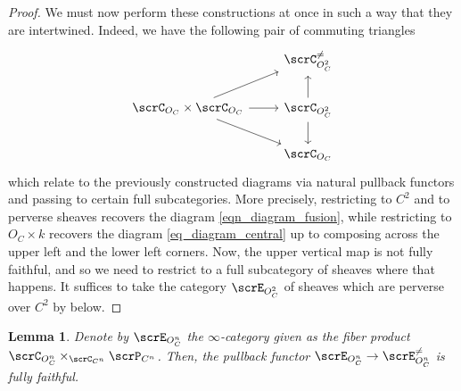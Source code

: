 \documentclass[10pt, reqno]{amsart}
\theoremstyle{plain}
\newtheorem{lemma}[theorem]{Lemma}
\theoremstyle{definition}
\numberwithin{equation}{section}
\begin{document}
\begin{proof}
		We must now perform these constructions at once in such a way that they are intertwined. Indeed, we have the following pair of commuting triangles
		\begin{equation}\begin{tikzcd}
				& \scrC_{O_C^2}^{\neq} \\
				\scrC_{O_C} \times \scrC_{O_C}& \scrC_{O_C^2}\\
				& \scrC_{O_C}
				\arrow[from=2-1, to=2-2]
				\arrow[from=2-1, to=1-2]
				\arrow[from=2-1, to=3-2]
				\arrow[from=2-2, to=1-2]
				\arrow[from=2-2, to=3-2]
			\end{tikzcd}
		\end{equation}
		which relate to the previously constructed diagrams via natural pullback functors and passing to certain full subcategories. More precisely, restricting to $C^2$ and to perverse sheaves recovers the diagram \eqref{eqn_diagram_fusion}, while restricting to $O_C \times k$ recovers the diagram \eqref{eq_diagram_central} up to composing across the upper left and the lower left corners. Now, the upper vertical map is not fully faithful, and so we need to restrict to a full subcategory of sheaves where that happens. It suffices to take the category $\scrE_{O_C^2}$ of sheaves which are perverse over $C^2$ by  below. 
	\end{proof}
	
	\begin{lemma}\label{lem_fully_faithful_integers}
		Denote by $\scrE_{O_C^n}$ the $\infty$-category given as the fiber product $ \scrC_{O_C^n} \times_{ \scrC_{C^n}} \scrP_{C^n}$. Then, the pullback functor $\scrE_{O_C^n}\to \scrE_{O_C^n}^{\neq}$ is fully faithful.
	\end{lemma}
	
\end{document}
